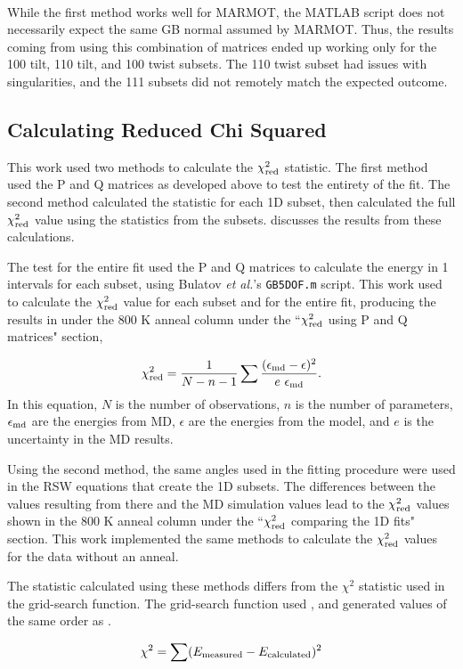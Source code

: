 \documentclass[12pt]{report}
\begin{document}
While the first method works well for MARMOT, the MATLAB\textsuperscript{\textregistered} script does not necessarily expect the same GB normal assumed by MARMOT.  Thus, the results coming from using this combination of matrices ended up working only for the \textlangle{}100\textrangle{} tilt, \textlangle{}110\textrangle{} tilt, and \textlangle{}100\textrangle{} twist subsets. The \textlangle{}110\textrangle{} twist subset had issues with singularities, and the \textlangle{}111\textrangle{} subsets did not remotely match the expected outcome.

\subsection{Calculating Reduced Chi Squared\label{chi2:chi2red}}
This work used two methods to calculate the $\chi^2_{\textnormal{red}}$ statistic.  The first method used the P and Q matrices as developed above to test the entirety of the fit.  The second method calculated the statistic for each 1D subset, then calculated the full $\chi^2_{\textnormal{red}}$ value using the statistics from the subsets.   discusses the results from these calculations.

The test for the entire fit used the P and Q matrices to calculate the energy in 1\textdegree{} intervals for each subset, using Bulatov \emph{et al.}'s \lstinline!GB5DOF.m! script.  This work used  to calculate the $\chi_{\textnormal{red}}^2$ value for each subset and for the entire fit, producing the results in  under the 800 K anneal column under the ``$\chi_{\textnormal{red}}^2$ using P and Q matrices" section,

\begin{equation}
\label{eq:chi2}
\chi^2_{\textnormal{red}} = \frac{1}{N-n-1} \sum \frac{(\epsilon_{\textnormal{md}} - \epsilon)^2}{e\ \epsilon_{\textnormal{md}}}.
\end{equation}
In this equation, $N$ is the number of observations, $n$ is the number of parameters, $\epsilon_{\textnormal{md}}$ are the energies from MD, $\epsilon$ are the energies from the model, and $e$ is the uncertainty in the MD results.

Using the second method, the same angles used in the fitting procedure were used in the RSW equations that create the 1D subsets.  The differences between the values resulting from there and the MD simulation values lead to the $\chi_{\textnormal{red}}^2$ values shown in the 800 K anneal column under the ``$\chi_{\textnormal{red}}^2$ comparing the 1D fits" section.  This work implemented the same methods to calculate the $\chi_{\textnormal{red}}^2$ values for the data without an anneal.

The statistic calculated using these methods differs from the $\chi^2$ statistic used in the grid-search function.  The grid-search function used , and generated values of the same order as .

\begin{equation}
\label{eq:chi2grid}
\chi^2=\sum (E_{\textnormal{measured}} - E_{\textnormal{calculated}})^2
\end{equation}
\newpage

\end{document}
